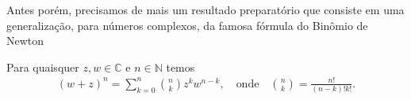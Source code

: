 Antes porém, precisamos de mais um resultado preparatório
que consiste em uma generalização, para números complexos, 
da famosa fórmula do Binômio de Newton

\begin{proposicao}
\label{prop-binom-newton}
Para quaisquer $z,w\in\mathbb{C}$ e $n\in\mathbb{N}$ temos 
\begin{align}\label{eq-form-binom-newton}
(w+z)^n = \sum_{k=0}^n \binom{n}{k}z^{k}w^{n-k}, 
\quad \text{onde}\quad \binom{n}{k} = \frac{n!}{(n-k)!k!}.
\end{align}
\end{proposicao}






